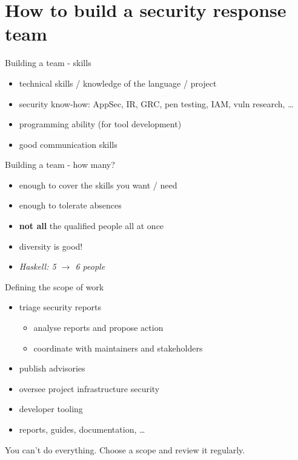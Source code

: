 \documentclass[ignorenonframetext,aspectratio=169,12pt]{beamer}
\begin{document}
\section{How to build a security response team}

\begin{frame}{Building a team - skills}
    \begin{itemize}
        \item technical skills / knowledge of the language / project
        \item security know-how: AppSec, IR, GRC, pen
          testing, IAM, vuln research, \ldots{}
        \item programming ability (for tool development)
        \item good communication skills
    \end{itemize}
\end{frame}

\begin{frame}{Building a team - how many?}
    \begin{itemize}
        \item enough to cover the skills you want / need
        \item enough to tolerate absences
        \item {\bf not all} the qualified people all at once
        \item diversity is good!
        \item {\em Haskell: 5 $\to$ 6 people}
    \end{itemize}
\end{frame}

\begin{frame}{Defining the scope of work}
  \begin{itemize}
    \item triage security reports
      \begin{itemize}
        \item analyse reports and propose action
        \item coordinate with maintainers and stakeholders
      \end{itemize}
    \item publish advisories
    \item oversee project infrastructure security
    \item developer tooling
    \item reports, guides, documentation, \ldots{}
  \end{itemize}

  You can't do everything.  Choose a scope and review it regularly.
\end{frame}
\end{document}
